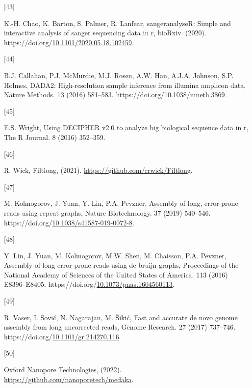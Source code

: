 \documentclass[preprint,3p,
a4paper]{elsarticle} %
\newlength{\cslhangindent}
\newlength{\csllabelwidth}
\newlength{\cslentryspacingunit} %
\newenvironment{CSLReferences}[2] %
 {%
  \setlength{\parindent}{0pt}
  \ifodd #1
  \let\oldpar\par
  \def\par{\hangindent=\cslhangindent\oldpar}
  \fi
  \setlength{\parskip}{#2\cslentryspacingunit}
 }%
 {}
\newcommand{\CSLLeftMargin}[1]{\parbox[t]{\csllabelwidth}{#1}}
\newcommand{\CSLRightInline}[1]{\parbox[t]{\linewidth - \csllabelwidth}{#1}\break}
\begin{document}
\begin{CSLReferences}{0}{0}
\leavevmode{}%
\CSLLeftMargin{{[}43{]} }%
\CSLRightInline{K.-H. Chao, K. Barton, S. Palmer, R. Lanfear,
sangeranalyseR: Simple and interactive analysis of sanger sequencing
data in r, bioRxiv. (2020).
https://doi.org/\href{https://doi.org/10.1101/2020.05.18.102459}{10.1101/2020.05.18.102459}.}

\leavevmode{}%
\CSLLeftMargin{{[}44{]} }%
\CSLRightInline{B.J. Callahan, P.J. McMurdie, M.J. Rosen, A.W. Han,
A.J.A. Johnson, S.P. Holmes, DADA2: High-resolution sample inference
from illumina amplicon data, Nature Methods. 13 (2016) 581--583.
https://doi.org/\href{https://doi.org/10.1038/nmeth.3869}{10.1038/nmeth.3869}.}

\leavevmode{}%
\CSLLeftMargin{{[}45{]} }%
\CSLRightInline{E.S. Wright, Using DECIPHER v2.0 to analyze big
biological sequence data in r, The R Journal. 8 (2016) 352--359.}

\leavevmode{}%
\CSLLeftMargin{{[}46{]} }%
\CSLRightInline{R. Wick, Filtlong, (2021).
\url{https://github.com/rrwick/Filtlong}.}

\leavevmode{}%
\CSLLeftMargin{{[}47{]} }%
\CSLRightInline{M. Kolmogorov, J. Yuan, Y. Lin, P.A. Pevzner, Assembly
of long, error-prone reads using repeat graphs, Nature Biotechnology. 37
(2019) 540--546.
https://doi.org/\href{https://doi.org/10.1038/s41587-019-0072-8}{10.1038/s41587-019-0072-8}.}

\leavevmode{}%
\CSLLeftMargin{{[}48{]} }%
\CSLRightInline{Y. Lin, J. Yuan, M. Kolmogorov, M.W. Shen, M. Chaisson,
P.A. Pevzner, Assembly of long error-prone reads using de bruijn graphs,
Proceedings of the National Academy of Sciences of the United States of
America. 113 (2016) E8396--E8405.
https://doi.org/\href{https://doi.org/10.1073/pnas.1604560113}{10.1073/pnas.1604560113}.}

\leavevmode{}%
\CSLLeftMargin{{[}49{]} }%
\CSLRightInline{R. Vaser, I. Sović, N. Nagarajan, M. Šikić, Fast and
accurate de novo genome assembly from long uncorrected reads, Genome
Research. 27 (2017) 737--746.
https://doi.org/\href{https://doi.org/10.1101/gr.214270.116}{10.1101/gr.214270.116}.}

\leavevmode{}%
\CSLLeftMargin{{[}50{]} }%
\CSLRightInline{Oxford Nanopore Technologies, (2022).
\url{https://github.com/nanoporetech/medaka}.}


\end{CSLReferences}
\end{document}

